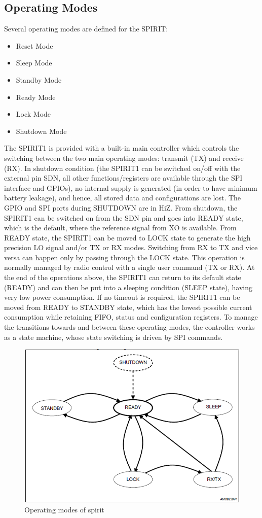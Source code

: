 \subsection{Operating Modes}
Several operating modes are defined for the SPIRIT:
\begin{itemize}
	\item Reset Mode
	\item Sleep Mode
	\item Standby Mode
	\item Ready Mode
	\item Lock Mode
	\item Shutdown Mode
\end{itemize}
The SPIRIT1 is provided with a built-in main controller which controls the switching between the two main operating modes: transmit (TX) and receive (RX). In shutdown condition (the SPIRIT1 can be switched on/off with the external pin SDN, all other functions/registers are available through the SPI interface and GPIOs), no internal supply is generated (in order to have minimum battery leakage), and hence, all stored data and configurations are lost. The GPIO and SPI ports during SHUTDOWN are in HiZ. From shutdown, the SPIRIT1 can be switched on from the SDN pin and goes into READY state, which is the default, where the reference signal from XO is available. From READY state, the SPIRIT1 can be moved to LOCK state to generate the high precision LO signal and/or TX or RX modes. Switching from RX to TX and vice versa can happen only by passing through the LOCK state. This operation is normally managed by radio control with a single user command (TX or RX). At the end of the operations above, the SPIRIT1 can return to its default state (READY) and can then be put into a sleeping condition (SLEEP state), having very low power consumption. If no timeout is required, the SPIRIT1 can be moved from READY to STANDBY state, which has the lowest possible current consumption while retaining FIFO, status and configuration registers. To manage the transitions towards and between these operating modes, the controller works as a state machine, whose state switching is driven by SPI commands. \\
\begin{figure}[ht]
	\centering
	\includegraphics[scale=0.8]{images/modes.png}
	\caption{Operating modes of spirit}
\end{figure}
